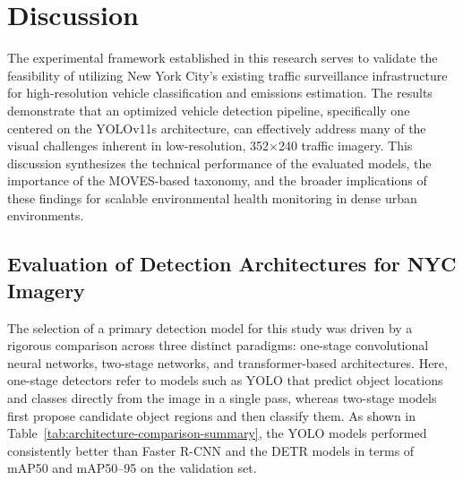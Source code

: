 \section{Discussion}

The experimental framework established in this research serves to validate the 
feasibility of utilizing New York City’s existing traffic surveillance infrastructure
for high-resolution vehicle classification and emissions estimation. The results 
demonstrate that an optimized vehicle detection pipeline, specifically one centered
on the YOLOv11s architecture, can effectively address many of the visual challenges 
inherent in low-resolution, 352$\times$240 traffic imagery. This discussion 
synthesizes the technical performance of the evaluated models, the importance of 
the MOVES-based taxonomy, and the broader implications of these findings for 
scalable environmental health monitoring in dense urban environments.


\subsection{Evaluation of Detection Architectures for NYC Imagery}

The selection of a primary detection model for this study was driven by a rigorous 
comparison across three distinct paradigms: one-stage convolutional neural networks,
two-stage networks, and transformer-based architectures. 
Here, one-stage detectors refer to models such as YOLO that predict object locations 
and classes directly from the image in a single pass, whereas two-stage models first 
propose candidate object regions and then classify them.
As shown in Table~\ref{tab:architecture-comparison-summary}, the YOLO models 
performed consistently better than Faster R-CNN and the 
DETR models in terms of mAP50 and mAP50--95 on the validation set.

